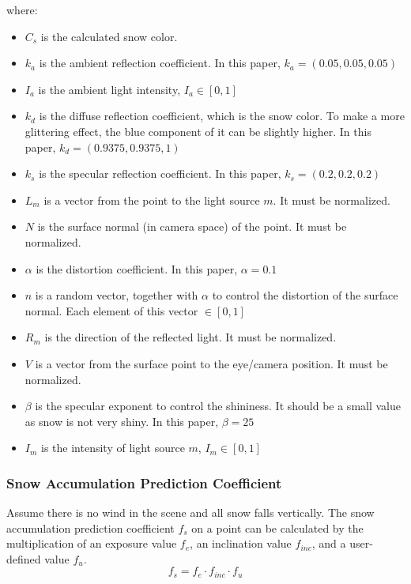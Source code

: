 \documentclass{article}
\begin{document}
where:
\begin{itemize}
  \item \( C_{s} \) is the calculated snow color.
  \item \( k_a \) is the ambient reflection coefficient. In this paper, \( k_a = (0.05, 0.05, 0.05)\)
  \item \( I_a \) is the ambient light intensity, \( I_a \in [0, 1]\)
  \item \( k_d \) is the diffuse reflection coefficient, which is the snow color. To make a more glittering effect, %
  the blue component of it can be slightly higher. In this paper, \( k_d = (0.9375, 0.9375, 1)\)
  \item \( k_s \) is the specular reflection coefficient. In this paper, \( k_s = (0.2, 0.2, 0.2)\)
  \item \( L_m \) is a vector from the point to the light source \( m \). It must be normalized.
  \item \( N \) is the surface normal (in camera space) of the point. It must be normalized.
  \item \( \alpha \) is the distortion coefficient. In this paper, \( \alpha = 0.1\)
  \item \( n \) is a random vector, together with \( \alpha \) to control the distortion of the surface normal. Each element of this 
  vector \(\in [0, 1]\)
  \item \( R_m \) is the direction of the reflected light. It must be normalized.
  \item \( V \) is a vector from the surface point to the eye/camera position. It must be normalized.
  \item \( \beta \) is the specular exponent to control the shininess. It should be a small value as snow is not very shiny. In this 
  paper, \( \beta = 25\)
  \item \( I_m \) is the intensity of light source \( m \), \( I_m \in [0, 1]\)
\end{itemize}

\subsubsection {Snow Accumulation Prediction Coefficient}
Assume there is no wind in the scene and all snow falls vertically. The snow accumulation prediction coefficient 
\( f_{s} \) on a point can be calculated by the multiplication of an exposure value \( f_{e} \), an inclination 
value \( f_{inc} \), and a user-defined value \( f_{u} \).
\[
  f_{s} = f_{e} \cdot f_{inc} \cdot f_{u}
\]
\end{document}
